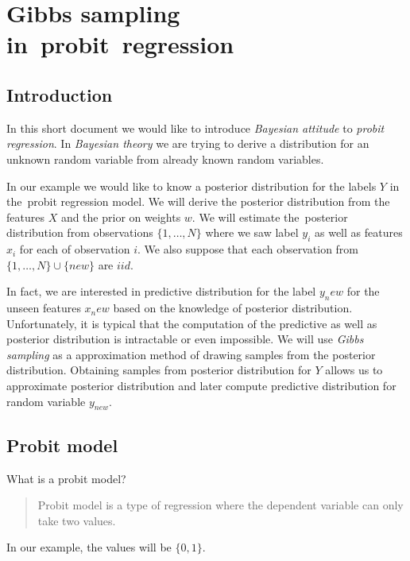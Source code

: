 

\chapter{Gibbs sampling in~probit~regression}
\label{cha:gibbs_sampling_for_probit_regression}


\section{Introduction} 
\label{sec:introduction}
In this short document we would like to introduce {\it Bayesian attitude} to {\it probit regression}. In {\it Bayesian theory} we are  trying to derive a distribution for an unknown random variable from already known random variables. 

In our example we would like to know a posterior distribution for the labels $Y$ in the~probit regression model. We will derive the posterior distribution from the features $X$ and the prior on weights $w$. We will estimate the~posterior distribution from observations $\{1,\ldots,N\}$ where we saw label $y_i$ as well as features $x_i$ for each of observation $i$. We also suppose that each observation from $\{1,\ldots,N\} \cup \{new\}$ are $iid$. 

In fact, we are interested in predictive distribution for the label $y_new$ for the unseen features $x_new$ based on the knowledge of posterior distribution. Unfortunately, it is typical that the computation of the predictive as well as posterior distribution is intractable or even impossible. We will use {\it Gibbs sampling} as a approximation method of drawing samples from the posterior distribution. Obtaining samples from posterior distribution for $Y$ allows us to approximate posterior distribution and later compute predictive distribution for random variable $y_{new}$.



\section{Probit model}
What is a probit model?
\begin{quotation}
    Probit model is a type of regression where the dependent variable can only take two values.
\end{quotation}\cite{wiki_probit}
In our example, the values will be $\{0,1\}$.

